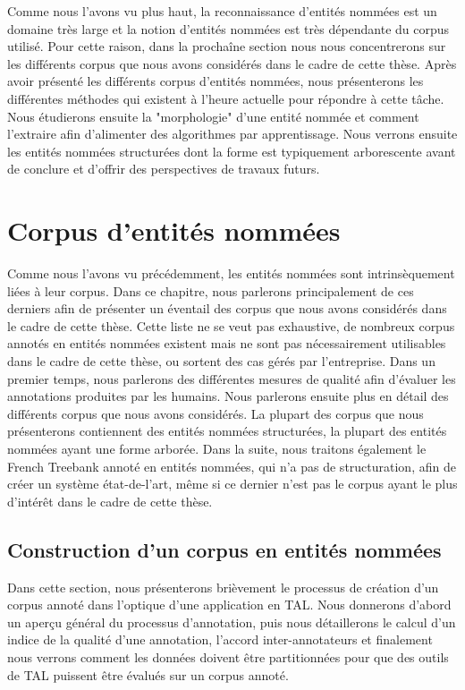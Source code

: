 \documentclass[12pt,a4paper,times,twoside,openright]{report}
\begin{document}
Comme nous l'avons vu plus haut, la reconnaissance d'entités nommées est un domaine très large et la notion d'entités nommées est très dépendante du corpus utilisé. Pour cette raison, dans la prochaîne section nous nous concentrerons sur les différents corpus que nous avons considérés dans le cadre de cette thèse. Après avoir présenté les différents corpus d'entités nommées, nous présenterons les différentes méthodes qui existent à l'heure actuelle pour répondre à cette tâche. Nous étudierons ensuite la "morphologie" d'une entité nommée et comment l'extraire afin d'alimenter des algorithmes par apprentissage. Nous verrons ensuite les entités nommées structurées dont la forme est typiquement arborescente avant de conclure et d'offrir des perspectives de travaux futurs.



\chapter{Corpus d'entités nommées}
\label{chap:NER-corpus}
\minitoc
Comme nous l'avons vu précédemment, les entités nommées sont intrinsèquement liées à leur corpus. Dans ce chapitre, nous parlerons principalement de ces derniers afin de présenter un éventail des corpus que nous avons considérés dans le cadre de cette thèse. Cette liste ne se veut pas exhaustive, de nombreux corpus annotés en entités nommées existent mais ne sont pas nécessairement utilisables dans le cadre de cette thèse, ou sortent des cas gérés par l'entreprise. Dans un premier temps, nous parlerons des différentes mesures de qualité afin d'évaluer les annotations produites par les humains. Nous parlerons ensuite plus en détail des différents corpus que nous avons considérés. La plupart des corpus que nous présenterons contiennent des entités nommées structurées, la plupart des entités nommées ayant une forme arborée. Dans la suite, nous traitons également le French Treebank annoté en entités nommées, qui n'a pas de structuration, afin de créer un système état-de-l'art, même si ce dernier n'est pas le corpus ayant le plus d'intérêt dans le cadre de cette thèse.



    \section{Construction d'un corpus en entités nommées}
    \label{sec:ne-corpus-constitution}
    
    Dans cette section, nous présenterons brièvement le processus de création d'un corpus annoté dans l'optique d'une application en TAL. Nous donnerons d'abord un aperçu général du processus d'annotation, puis nous détaillerons le calcul d'un indice de la qualité d'une annotation, l'accord inter-annotateurs et finalement nous verrons comment les données doivent être partitionnées pour que des outils de TAL puissent être évalués sur un corpus annoté.
    
\end{document}

